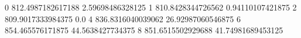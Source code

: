 0 812.4987182617188 2.59698486328125
1 810.8428344726562 0.94110107421875
2 809.9017333984375 0.0
4 836.8316040039062 26.92987060546875
6 854.465576171875 44.5638427734375
8 851.6515502929688 41.74981689453125
